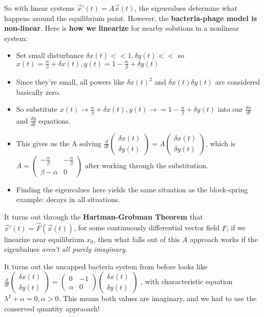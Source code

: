 \documentclass[11pt, oneside]{article}   	%
\begin{document}
\begin{itemize}
So with linear systems $\vec{x}'(t) = A\vec{x}(t)$, the eigenvalues determine what happens around the equilibrium point.  However, the \textbf{bacteria-phage model is non-linear}.  Here is \textbf{how we linearize} for nearby solutions in a nonlinear system:
\begin{itemize}
\item Set small disturbance $\delta x(t) << 1, \delta y(t) << $ so $x(t) = \frac{\alpha}{\beta} + \delta x(t), y(t) = 1-\frac{\alpha}{\beta} + \delta y(t)$
\item Since they're small, all powers like $\delta x(t)^2$ and $\delta x(t) \delta y(t)$ are considered basically zero.
\item So substitute $x(t) \rightarrow \frac{\alpha}{\beta} + \delta x(t), y(t) \rightarrow = 1-\frac{\alpha}{\beta} + \delta y(t)$ into our $\frac{dx}{dt}$ and $\frac{dy}{dt}$ equations.
\item This gives us the A solving $\frac{d}{dt} \begin{pmatrix} \delta x(t) \\ \delta y(t) \end{pmatrix} = A \begin{pmatrix}\delta x(t) \\ \delta  y(t)\end{pmatrix}$, which is $A = \begin{pmatrix} -\frac{\alpha}{\beta} & -\frac{\alpha}{\beta}  \\ \beta - \alpha & 0 \end{pmatrix}$ after working through the substitution.
\item Finding the eigenvalues here yields the same situation as the block-spring example: decays in all situations.
\end{itemize}

It turns out through the \textbf{Hartman-Grobman Theorem} that $\vec{x}'(t) = \vec{F}(\vec{x}(t))$, for some continuously differential vector field $F$, if we linearize near equilibrium $x_0$, then what falls out of this $A$ approach works if the eigenbalues \emph{aren't all purely imaginary}.

It turns out the uncapped bacteria system from before looks like $\frac{d}{dt} \begin{pmatrix} \delta x(t) \\ \delta y(t) \end{pmatrix} =  \begin{pmatrix} 0 & -1 \\ \alpha & 0 \end{pmatrix}  \begin{pmatrix} \delta x(t) \\ \delta y(t)\end{pmatrix}$ , with characteristic equation $\lambda ^2 + \alpha = 0, \alpha > 0$.  This means both values are imaginary, and we had to use the conserved quantity appraoach! 

\end{itemize}
\end{document}
